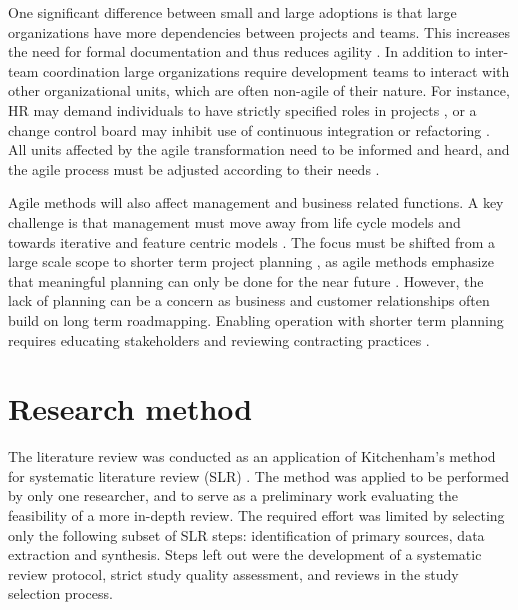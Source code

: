 \documentclass[lnbip]{svmultln}
\begin{document}
One significant difference between small and large adoptions is that large
organizations have more dependencies between projects and teams. This increases
the need for formal documentation and thus reduces agility .
In addition to inter-team coordination large organizations require development
teams to interact with other organizational units, which are often non-agile of
their nature. For instance, HR may demand individuals to have strictly specified
roles in projects , or a change control board may inhibit use of
continuous integration or refactoring . All units affected by
the agile transformation need to be informed and heard, and the agile process
must be adjusted according to their needs .

Agile methods will also affect management and business related functions. A key
challenge is that management must move away from life cycle models and towards
iterative and feature centric models . The focus must be shifted
from a large scale scope to shorter term project planning , as
agile methods emphasize that meaningful planning can only be done for the near
future . However, the lack of planning can be a concern as
business and customer relationships often build on long term roadmapping.
Enabling operation with shorter term planning requires educating stakeholders
and reviewing contracting practices .


\section{Research method}
\label{sec:method}

%
%
%


The literature review was conducted as an application of Kitchenham's
method for systematic literature review (SLR) . The method
was applied to be performed by only one researcher, and to serve as a
preliminary work evaluating the feasibility of a more in-depth review. The
required effort was limited by selecting only the following subset of SLR steps:
identification of primary sources, data extraction and synthesis. Steps left out
were the development of a systematic review protocol, strict study quality
assessment, and reviews in the study selection process.
\end{document}
